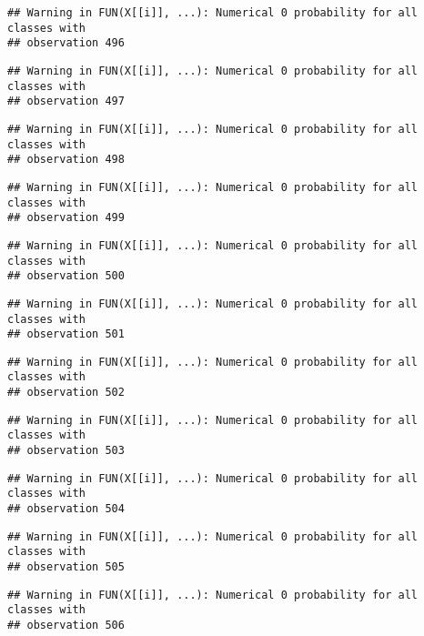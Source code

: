 \documentclass[
]{article}
\begin{document}
\begin{verbatim}
## Warning in FUN(X[[i]], ...): Numerical 0 probability for all classes with
## observation 496
\end{verbatim}

\begin{verbatim}
## Warning in FUN(X[[i]], ...): Numerical 0 probability for all classes with
## observation 497
\end{verbatim}

\begin{verbatim}
## Warning in FUN(X[[i]], ...): Numerical 0 probability for all classes with
## observation 498
\end{verbatim}

\begin{verbatim}
## Warning in FUN(X[[i]], ...): Numerical 0 probability for all classes with
## observation 499
\end{verbatim}

\begin{verbatim}
## Warning in FUN(X[[i]], ...): Numerical 0 probability for all classes with
## observation 500
\end{verbatim}

\begin{verbatim}
## Warning in FUN(X[[i]], ...): Numerical 0 probability for all classes with
## observation 501
\end{verbatim}

\begin{verbatim}
## Warning in FUN(X[[i]], ...): Numerical 0 probability for all classes with
## observation 502
\end{verbatim}

\begin{verbatim}
## Warning in FUN(X[[i]], ...): Numerical 0 probability for all classes with
## observation 503
\end{verbatim}

\begin{verbatim}
## Warning in FUN(X[[i]], ...): Numerical 0 probability for all classes with
## observation 504
\end{verbatim}

\begin{verbatim}
## Warning in FUN(X[[i]], ...): Numerical 0 probability for all classes with
## observation 505
\end{verbatim}

\begin{verbatim}
## Warning in FUN(X[[i]], ...): Numerical 0 probability for all classes with
## observation 506
\end{verbatim}
\end{document}
